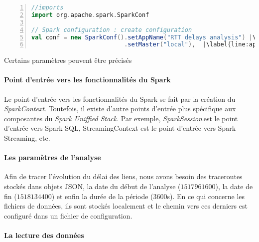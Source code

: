 \begin{lstlisting}[language=scala,firstnumber=1, caption={Exemple de configuration avec SparkConf},label={lst:label}, basicstyle = \footnotesize,escapechar=|,numbers=left,
stepnumber=1]
//imports
import org.apache.spark.SparkConf

// Spark configuration : create configuration
val conf = new SparkConf().setAppName("RTT delays analysis") |\label{line:app-name}|
                          .setMaster("local"),  |\label{line:app-thread}|
\end{lstlisting}

Certains paramètres peuvent être précisés 




\paragraph{Point d'entrée vers les fonctionnalités du Spark}

Le point d'entrée vers les fonctionnalités du Spark se fait par la création du  \textit{SparkContext}. Toutefois, il existe d'autre points d'entrée plus spécifique aux composantes du \textit{Spark Uniffied Stack}. Par exemple,  \textit{SparkSession} est le point d'entrée vers Spark SQL, StreamingContext est le point d'entrée vers Spark Streaming, etc.


\paragraph{Les paramètres de l'analyse}

Afin de tracer l'évolution du délai des liens, nous avons besoin des traceroutes stockés dans objets JSON, la date du début de l'analyse ($ 1517961600 $), la date de fin ($ 1518134400 $) et enfin la durée de la période ($3600$s). En ce qui concerne les fichiers de données, ils sont stockés localement et le chemin vers ces derniers est configuré dans un fichier de configuration.


\paragraph{La lecture des données}

